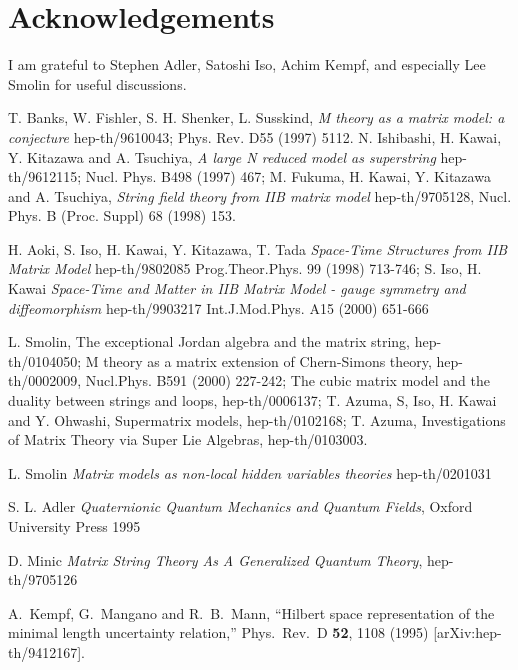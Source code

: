\documentclass[a4paper,11pt]{article}
\begin{document}
\section*{Acknowledgements}
I am grateful to Stephen Adler, Satoshi Iso, Achim Kempf, and
especially Lee Smolin for useful discussions.





\begin{thebibliography}{99}


T. Banks, W. Fishler, S. H. Shenker, L. Susskind,
{\it M theory as a matrix model: a conjecture} hep-th/9610043;
 Phys. Rev. D55 (1997) 5112.
N. Ishibashi, H. Kawai, Y. Kitazawa and A. Tsuchiya,
{\it A large N reduced model as superstring} hep-th/9612115; Nucl.
Phys. B498 (1997) 467;  M. Fukuma, H. Kawai, Y. Kitazawa and A.
Tsuchiya, {\it String field theory from IIB matrix model}
hep-th/9705128, Nucl. Phys. B (Proc. Suppl) 68 (1998) 153.



H. Aoki, S. Iso, H. Kawai, Y. Kitazawa, T. Tada
 {\it Space-Time
Structures from IIB Matrix Model}
 hep-th/9802085
Prog.Theor.Phys. 99 (1998) 713-746; S. Iso, H. Kawai {\it
Space-Time and Matter in IIB Matrix Model - gauge symmetry and
diffeomorphism } hep-th/9903217 Int.J.Mod.Phys. A15 (2000) 651-666



L. Smolin, The exceptional Jordan algebra and the matrix string,
hep-th/0104050; M theory as a matrix extension of Chern-Simons
theory, hep-th/0002009, Nucl.Phys. B591 (2000) 227-242; The cubic
matrix model and the duality between strings and loops,
hep-th/0006137; T. Azuma, S, Iso, H. Kawai and Y. Ohwashi,
Supermatrix models, hep-th/0102168; T. Azuma, Investigations of
Matrix Theory via Super Lie Algebras, hep-th/0103003.



L. Smolin {\it Matrix models as non-local hidden variables
theories }  hep-th/0201031


S. L. Adler {\it Quaternionic Quantum Mechanics and Quantum
Fields},  Oxford University Press  1995


D. Minic {\it   Matrix String Theory As A Generalized Quantum
Theory}, hep-th/9705126

A.~Kempf, G.~Mangano and R.~B.~Mann, ``Hilbert space
representation of the minimal length uncertainty relation,''
Phys.\ Rev.\ D {\bf 52}, 1108 (1995) [arXiv:hep-th/9412167].


\end{thebibliography}
\end{document}
